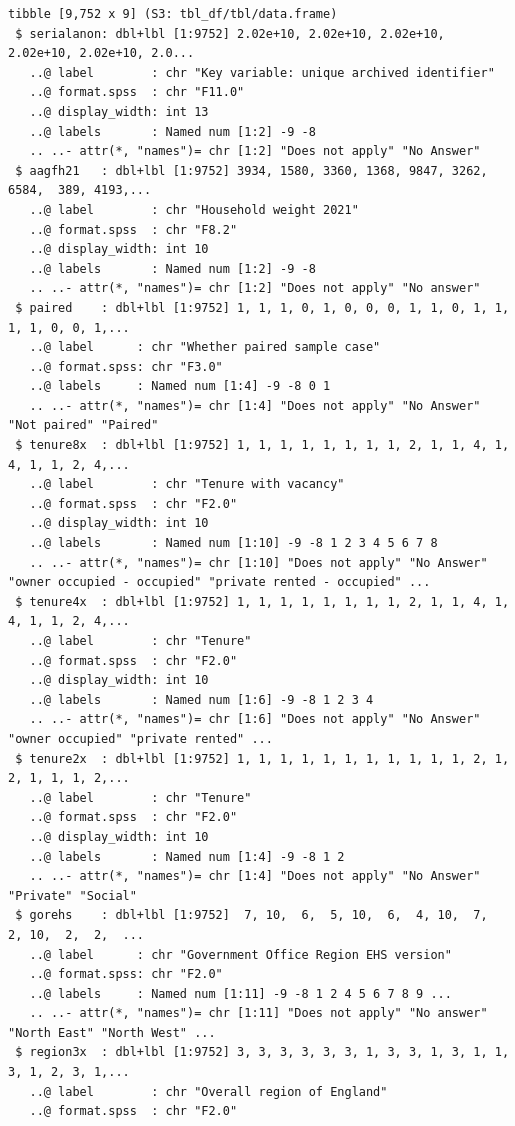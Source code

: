 \documentclass[
  letterpaper,
  DIV=11,
  numbers=noendperiod]{scrreprt}
\begin{document}
\begin{verbatim}
tibble [9,752 x 9] (S3: tbl_df/tbl/data.frame)
 $ serialanon: dbl+lbl [1:9752] 2.02e+10, 2.02e+10, 2.02e+10, 2.02e+10, 2.02e+10, 2.0...
   ..@ label        : chr "Key variable: unique archived identifier"
   ..@ format.spss  : chr "F11.0"
   ..@ display_width: int 13
   ..@ labels       : Named num [1:2] -9 -8
   .. ..- attr(*, "names")= chr [1:2] "Does not apply" "No Answer"
 $ aagfh21   : dbl+lbl [1:9752] 3934, 1580, 3360, 1368, 9847, 3262, 6584,  389, 4193,...
   ..@ label        : chr "Household weight 2021"
   ..@ format.spss  : chr "F8.2"
   ..@ display_width: int 10
   ..@ labels       : Named num [1:2] -9 -8
   .. ..- attr(*, "names")= chr [1:2] "Does not apply" "No answer"
 $ paired    : dbl+lbl [1:9752] 1, 1, 1, 0, 1, 0, 0, 0, 1, 1, 0, 1, 1, 1, 1, 0, 0, 1,...
   ..@ label      : chr "Whether paired sample case"
   ..@ format.spss: chr "F3.0"
   ..@ labels     : Named num [1:4] -9 -8 0 1
   .. ..- attr(*, "names")= chr [1:4] "Does not apply" "No Answer" "Not paired" "Paired"
 $ tenure8x  : dbl+lbl [1:9752] 1, 1, 1, 1, 1, 1, 1, 1, 2, 1, 1, 4, 1, 4, 1, 1, 2, 4,...
   ..@ label        : chr "Tenure with vacancy"
   ..@ format.spss  : chr "F2.0"
   ..@ display_width: int 10
   ..@ labels       : Named num [1:10] -9 -8 1 2 3 4 5 6 7 8
   .. ..- attr(*, "names")= chr [1:10] "Does not apply" "No Answer" "owner occupied - occupied" "private rented - occupied" ...
 $ tenure4x  : dbl+lbl [1:9752] 1, 1, 1, 1, 1, 1, 1, 1, 2, 1, 1, 4, 1, 4, 1, 1, 2, 4,...
   ..@ label        : chr "Tenure"
   ..@ format.spss  : chr "F2.0"
   ..@ display_width: int 10
   ..@ labels       : Named num [1:6] -9 -8 1 2 3 4
   .. ..- attr(*, "names")= chr [1:6] "Does not apply" "No Answer" "owner occupied" "private rented" ...
 $ tenure2x  : dbl+lbl [1:9752] 1, 1, 1, 1, 1, 1, 1, 1, 1, 1, 1, 2, 1, 2, 1, 1, 1, 2,...
   ..@ label        : chr "Tenure"
   ..@ format.spss  : chr "F2.0"
   ..@ display_width: int 10
   ..@ labels       : Named num [1:4] -9 -8 1 2
   .. ..- attr(*, "names")= chr [1:4] "Does not apply" "No Answer" "Private" "Social"
 $ gorehs    : dbl+lbl [1:9752]  7, 10,  6,  5, 10,  6,  4, 10,  7,  2, 10,  2,  2,  ...
   ..@ label      : chr "Government Office Region EHS version"
   ..@ format.spss: chr "F2.0"
   ..@ labels     : Named num [1:11] -9 -8 1 2 4 5 6 7 8 9 ...
   .. ..- attr(*, "names")= chr [1:11] "Does not apply" "No answer" "North East" "North West" ...
 $ region3x  : dbl+lbl [1:9752] 3, 3, 3, 3, 3, 3, 1, 3, 3, 1, 3, 1, 1, 3, 1, 2, 3, 1,...
   ..@ label        : chr "Overall region of England"
   ..@ format.spss  : chr "F2.0"

\end{verbatim}
\end{document}
